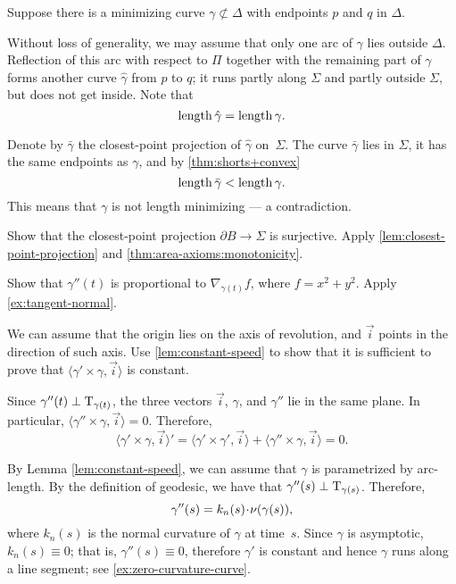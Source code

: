 \begin{multicols}{2}
Suppose there is a minimizing curve $\gamma\not\subset\Delta$ with endpoints $p$ and $q$ in $\Delta$.

Without loss of generality, we may assume that only one arc of $\gamma$ lies outside $\Delta$.
Reflection of this arc with respect to $\Pi$ together with the remaining part of $\gamma$ forms another curve $\hat\gamma$ from $p$ to $q$;
it runs partly along $\Sigma$ 
and partly outside $\Sigma$,
but does not get inside.
Note that
\[\mathop{\rm length}\nolimits\hat\gamma=\mathop{\rm length}\nolimits\gamma.\]


Denote by $\bar\gamma$ the closest-point projection of $\hat\gamma$ on~$\Sigma$.
The curve $\bar\gamma$ lies in $\Sigma$, 
it has the same endpoints as $\gamma$,
and by \ref{thm:shorts+convex}
\[\mathop{\rm length}\nolimits\bar\gamma<\mathop{\rm length}\nolimits\gamma.\]
This means that $\gamma$ is not length minimizing --- 
a contradiction.

Show that the closest-point projection $\partial B\to\Sigma$ is surjective.
Apply \ref{lem:closest-point-projection} and \ref{thm:area-axioms:monotonicity}.


\setcounter{eqtn}{0}

 Show that $\gamma''(t)$ is proportional to $\nabla_{\gamma(t)} f$, where $f=x^2+y^2$. 
Apply \ref{ex:tangent-normal}.

We can assume that the origin lies on the axis of revolution, and $\vec i$ points in the direction of such axis.
Use \ref{lem:constant-speed} to show that it is sufficient to prove that 
$\langle\gamma'\times \gamma,\vec i\rangle$
is constant.

Since $\gamma''(t)\perp\mathrm{T}_{\gamma(t)}$, the three vectors $\vec i$, $\gamma$, and $\gamma''$ lie in the same plane.
In particular, $\langle\gamma''\times \gamma,\vec i\rangle=0$.
Therefore,
\[
\langle\gamma'\times \gamma,\vec i\rangle'
=
\langle\gamma'\times \gamma',\vec i\rangle+\langle\gamma''\times \gamma,\vec i\rangle =0
.\]



 By Lemma \ref{lem:constant-speed},
we can assume that $\gamma$ is parametrized by arc-length.
By the definition of geodesic, we have that $\gamma''(s)\perp\mathrm{T}_{\gamma(s)}$. 
Therefore, 
\[\gamma''(s)=k_n(s)\cdot\Norm(\gamma(s)),\]
where $k_n(s)$ is the normal curvature of $\gamma$ at time~$s$.
Since $\gamma$ is asymptotic, $k_n(s)\equiv 0$;
that is, $\gamma''(s)\equiv 0$, therefore $\gamma'$ is constant and hence $\gamma$ runs along a line segment; see \ref{ex:zero-curvature-curve}.





\end{multicols}

